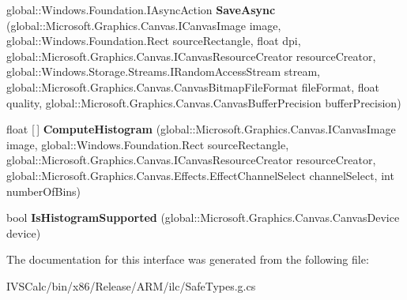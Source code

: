 \begin{DoxyCompactItemize}
\item 
\mbox{\label{interface_microsoft_1_1_graphics_1_1_canvas_1_1_i_canvas_image_statics_a21753a6236cd5f5b4187172eb1f59d72}} 
global\+::\+Windows.\+Foundation.\+I\+Async\+Action {\bfseries Save\+Async} (global\+::\+Microsoft.\+Graphics.\+Canvas.\+I\+Canvas\+Image image, global\+::\+Windows.\+Foundation.\+Rect source\+Rectangle, float dpi, global\+::\+Microsoft.\+Graphics.\+Canvas.\+I\+Canvas\+Resource\+Creator resource\+Creator, global\+::\+Windows.\+Storage.\+Streams.\+I\+Random\+Access\+Stream stream, global\+::\+Microsoft.\+Graphics.\+Canvas.\+Canvas\+Bitmap\+File\+Format file\+Format, float quality, global\+::\+Microsoft.\+Graphics.\+Canvas.\+Canvas\+Buffer\+Precision buffer\+Precision)
\item 
\mbox{\label{interface_microsoft_1_1_graphics_1_1_canvas_1_1_i_canvas_image_statics_a21324f0dd43dd52006fc02fb9aa474d3}} 
float \mbox{[}$\,$\mbox{]} {\bfseries Compute\+Histogram} (global\+::\+Microsoft.\+Graphics.\+Canvas.\+I\+Canvas\+Image image, global\+::\+Windows.\+Foundation.\+Rect source\+Rectangle, global\+::\+Microsoft.\+Graphics.\+Canvas.\+I\+Canvas\+Resource\+Creator resource\+Creator, global\+::\+Microsoft.\+Graphics.\+Canvas.\+Effects.\+Effect\+Channel\+Select channel\+Select, int number\+Of\+Bins)
\item 
\mbox{\label{interface_microsoft_1_1_graphics_1_1_canvas_1_1_i_canvas_image_statics_ae36ced4f89421bf05ceea6e51eb6f95b}} 
bool {\bfseries Is\+Histogram\+Supported} (global\+::\+Microsoft.\+Graphics.\+Canvas.\+Canvas\+Device device)
\end{DoxyCompactItemize}


The documentation for this interface was generated from the following file\+:\begin{DoxyCompactItemize}
\item 
I\+V\+S\+Calc/bin/x86/\+Release/\+A\+R\+M/ilc/Safe\+Types.\+g.\+cs\end{DoxyCompactItemize}
